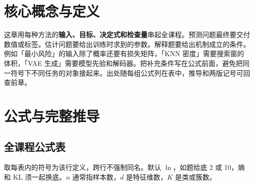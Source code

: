 \documentclass[UTF8,a4paper,zihao=-4,fontset=fandol]{ctexrep}
\begin{document}
\section{核心概念与定义}
这章用每种方法的\textbf{输入、目标、决定式和检查量}串起全课程。预测问题最终要交付数值或标签。估计问题要给出训练时求到的参数。解释题要给出机制成立的条件。例如「最小风险」的输入除了概率还要有损失矩阵，「KNN 密度」需要搜索窗的体积，「VAE 生成」需要模型先验和解码器。把补充条件写在公式前面，避免把同一符号下不同任务的对象接起来。出处随每组公式列在表中，推导和两版记号可回查前章。

\section{公式与完整推导}
\subsection{全课程公式表}
取每表内的符号为该行定义，跨行不强制同名。默认 $\ln$，如题给底 2 或 10，熵和 KL 须一起换底。$n$ 通常指样本数，$d$ 是特征维数，$K$ 是类或簇数。
\end{document}
